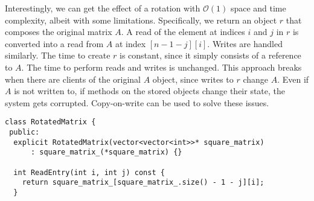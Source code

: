 \documentclass[10pt,openany,twoside,letterpaper,extrafontsizes]{memoir}
\newif\ifCpp
\newcommand{\myindex}[1]{%
\index[terms]{#1}%
}
\begin{document}
\begin{Spacing}{\arraysSpacing}

Interestingly, we can get the effect of a rotation with \myindex{$\mathcal{O}(1)$ space}$\mathcal{O}(1)$
space and time complexity, albeit with some limitations.
Specifically, we return an object $r$ that composes the original \myindex{matrix}matrix $A$.
A read of the element at indices $i$ and $j$ in $r$ is converted into a read
from $A$ at index $[n-1-j][i]$. Writes are handled similarly.
The time to create $r$ is constant, since it simply consists of a reference to $A$.
The time to perform reads and writes is unchanged. This approach breaks when
there are clients of the original $A$ object, since writes to $r$ change $A$.
Even if $A$ is not written to, if methods on the stored objects change their state,
the system gets corrupted. Copy-on-write can be used to solve these issues.
\ifCpp
\begin{lstlisting}[language={[11]C++}]
class RotatedMatrix {
 public:
  explicit RotatedMatrix(vector<vector<int>>* square_matrix)
      : square_matrix_(*square_matrix) {}

  int ReadEntry(int i, int j) const {
    return square_matrix_[square_matrix_.size() - 1 - j][i];
  }


\end{lstlisting}
\end{Spacing}
\end{document}
